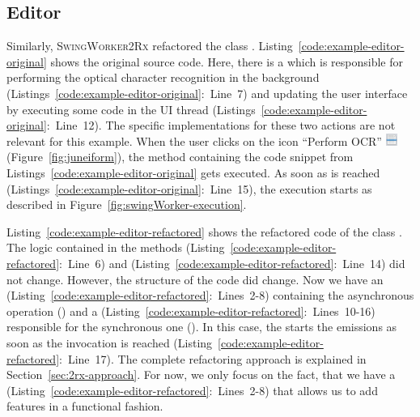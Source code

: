 \documentclass[type=bsc,accentcolor=tud9c]{tudthesis}
\newcommand{\toolextension}{\textsc{SwingWorker2Rx}}
\begin{document}
\newpage
\subsection{Editor}

Similarly, \toolextension{} refactored the class . Listing~\ref{code:example-editor-original} shows the original source code. Here, there is a  which is responsible for performing the optical character recognition in the background (Listings~\ref{code:example-editor-original}:~Line~7) and updating the user interface by executing some code in the UI thread (Listings~\ref{code:example-editor-original}:~Line~12). The specific implementations for these two actions are not relevant for this example. When the user clicks on the icon ``Perform OCR'' \includegraphics[height=0.4cm]{juneiform/ocr-icon.png} (Figure~\ref{fig:juneiform}), the method containing the code snippet from Listings~\ref{code:example-editor-original} gets executed. As soon as  is reached (Listings~\ref{code:example-editor-original}:~Line~15), the  execution starts as described in Figure~\ref{fig:swingWorker-execution}. 



Listing~\ref{code:example-editor-refactored} shows the refactored code of the class . The logic contained in the methods  (Listing~\ref{code:example-editor-refactored}:~Line~6) and  (Listing~\ref{code:example-editor-refactored}:~Line~14) did not change. However, the structure of the code did change. Now we have an  (Listing~\ref{code:example-editor-refactored}:~Lines~2-8) containing the asynchronous operation () and a  (Listing~\ref{code:example-editor-refactored}:~Lines~10-16) responsible for the synchronous one (). In this case, the  starts the emissions as soon as the  invocation is reached (Listing~\ref{code:example-editor-refactored}:~Line~17). The complete refactoring approach is explained in Section~\ref{sec:2rx-approach}. For now, we only focus on the fact, that we have a  (Listing~\ref{code:example-editor-refactored}:~Lines~2-8) that allows us to add features in a functional fashion.


\end{document}
